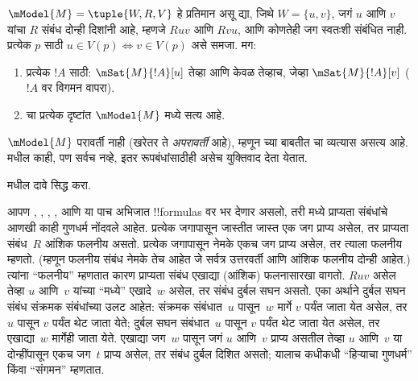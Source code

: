 \documentclass[../../../include/open-logic-section]{subfiles}
\begin{document}
\begin{prop}
  $\mModel{M} = \tuple{W, R, V}$ हे प्रतिमान असू द्या,
  जिथे $W = \{u, v
  \}$, जगं $u$ आणि $v$ यांचा $R$ संबंध दोन्ही दिशांनी
  आहे, म्हणजे $Ruv$ आणि $Rvu$, आणि कोणतेही जग स्वतःशी
  संबंधित नाही. प्रत्येक $p$ साठी $u \in V(p) \Leftrightarrow v
  \in V(p)$ असे समजा. मग:
  \begin{enumerate}
  \item प्रत्येक $!A$ साठी: $\mSat{M}{!A}[u]$ तेव्हा आणि
    केवळ तेव्हाच, जेव्हा $\mSat{M}{!A}[v]$
    ($!A$ वर विगमन वापरा).
  \item {} चा प्रत्येक दृष्टांत $\mModel{M}$ मध्ये सत्य आहे.
  \end{enumerate}
  $\mModel{M}$ परावर्ती नाही (खरेतर ते
  \emph{अपरावर्ती} आहे), म्हणून  च्या बाबतीत
   चा व्यत्यास असत्य आहे.
   मधील काही, पण सर्वच नव्हे,
  इतर रूपबंधांसाठीही असेच युक्तिवाद देता येतात.
\end{prop}

\begin{prob}
   मधील दावे सिद्ध करा.
\end{prob}

आपण , , , , आणि 
या पाच अभिजात !!{formula}s वर भर देणार असलो, तरी
 मध्ये प्राप्यता संबंधांचे आणखी
काही गुणधर्म नोंदवले आहेत. प्रत्येक जगापासून जास्तीत
जास्त एक जग प्राप्य असेल, तर प्राप्यता संबंध~$R$
आंशिक फलनीय असतो. प्रत्येक जगापासून नेमके
एकच जग प्राप्य असेल, तर त्याला फलनीय म्हणतो.
(म्हणून फलनीय संबंध नेमके तेच आहेत जे सर्वत्र उत्तरवर्ती
आणि आंशिक फलनीय दोन्ही आहेत.) त्यांना ``फलनीय''
म्हणतात कारण प्राप्यता संबंध एखाद्या (आंशिक) फलनासारखा
वागतो. $Ruv$ असेल तेव्हा $u$ आणि~$v$ यांच्या
``मध्ये'' एखादे~$w$ असेल, तर संबंध दुर्बल सघन
असतो. एका अर्थाने दुर्बल सघन संबंध संक्रमक संबंधांच्या
उलट आहेत: संक्रमक संबंधात~$u$ पासून~$w$ मार्गे
$v$ पर्यंत जाता येत असेल, तर $u$ पासून $v$ पर्यंत
थेट जाता येते; दुर्बल सघन संबंधात~$u$ पासून $v$
पर्यंत थेट जाता येत असेल, तर एखाद्या~$w$ मार्गेही
जाता येते. एखाद्या जग~$w$ पासून जगं $u$ आणि~$v$
प्राप्य असतील तेव्हा $u$ आणि~$v$ या दोन्हींपासून
एकच जग~$t$ प्राप्य असेल, तर संबंध दुर्बल दिशित असतो;
यालाच कधीकधी ``हिऱ्याचा गुणधर्म'' किंवा ``संगमन''
म्हणतात.
\end{document}
